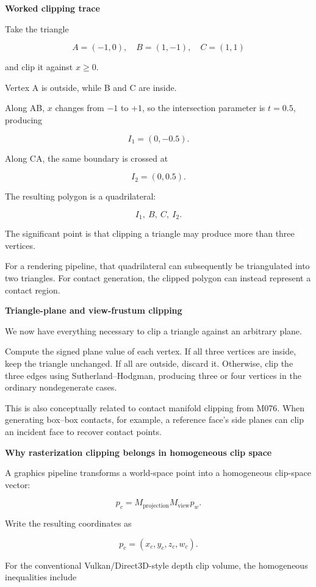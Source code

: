 \textbf{Worked clipping trace}

Take the triangle

\[
A=(-1,0),\quad B=(1,-1),\quad C=(1,1)
\]

and clip it against \(x\ge0\).

Vertex A is outside, while B and C are inside.

Along AB, \(x\) changes from \(-1\) to \(+1\), so the intersection parameter is \(t=0.5\), producing

\[
I_1=(0,-0.5).
\]

Along CA, the same boundary is crossed at

\[
I_2=(0,0.5).
\]

The resulting polygon is a quadrilateral:

\[
I_1,\ B,\ C,\ I_2.
\]

The significant point is that clipping a triangle may produce more than three vertices.

For a rendering pipeline, that quadrilateral can subsequently be triangulated into two triangles. For contact generation, the clipped polygon can instead represent a contact region.

\textbf{Triangle-plane and view-frustum clipping}

We now have everything necessary to clip a triangle against an arbitrary plane.

Compute the signed plane value of each vertex. If all three vertices are inside, keep the triangle unchanged. If all are outside, discard it. Otherwise, clip the three edges using Sutherland--Hodgman, producing three or four vertices in the ordinary nondegenerate cases.

This is also conceptually related to contact manifold clipping from M076. When generating box--box contacts, for example, a reference face's side planes can clip an incident face to recover contact points.

\textbf{Why rasterization clipping belongs in homogeneous clip space}

A graphics pipeline transforms a world-space point into a homogeneous clip-space vector:

\[
p_c=M_{\text{projection}}M_{\text{view}}p_w.
\]

Write the resulting coordinates as

\[
p_c=(x_c,y_c,z_c,w_c).
\]

For the conventional Vulkan/Direct3D-style depth clip volume, the homogeneous inequalities include

